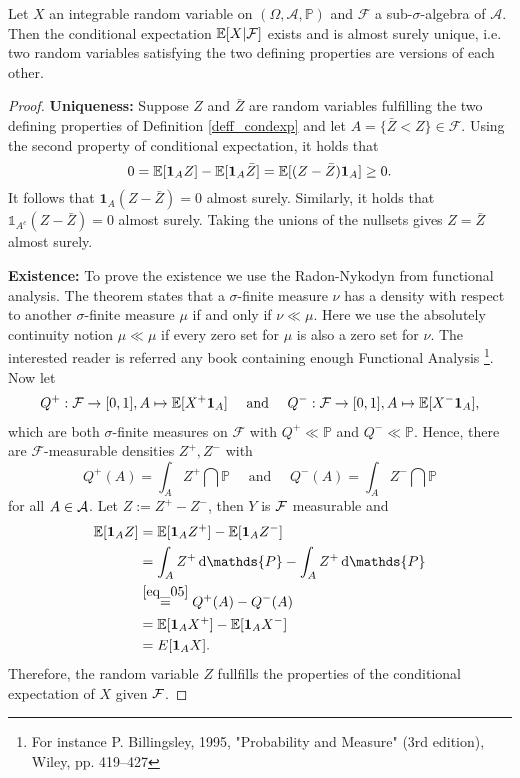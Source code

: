 \begin{lsuperwichtigersatzExistence}
\begin{theorem}\label{existenceCE}
	Let $X$ an integrable random variable on $(\Omega, \mathcal A, \mathbb P)$ and $\mathcal F$ a sub-$\sigma$-algebra of $\mathcal A$. Then the conditional expectation $\mathbb{E}[X|\mathcal F]$ exists and is almost surely unique, i.e. two random variables satisfying the two defining properties are versions of each other.
\end{theorem}
\end{lsuperwichtigersatzExistence}
\begin{proof}[Proof]
	\textbf{Uniqueness:} Suppose $Z$ and $\bar Z$ are random variables fulfilling the two defining properties of Definition \ref{deff_condexp} and let $A=\{\bar Z<Z\}\in\mathcal{F}.$ Using the second property of conditional expectation, it holds that 
	$$0=\mathbb{E}[\mathbf{1}_AZ]-\mathbb{E}[\mathbf{1}_A\bar{Z}]=\mathbb{E}[(Z-\bar{Z})\mathbf{1}_A]\ge0.$$ It follows that $\mathbf{1}_A(Z-\bar{Z})=0$ almost surely. Similarly, it holds that $\mathds{1}_{A^c}(Z-\bar{Z})=0$ almost surely. Taking the unions of the nullsets gives $Z=\bar Z$ almost surely.\smallskip
	
	\textbf{Existence:} To prove the existence we use the Radon-Nykodyn from functional analysis. The theorem states that a $\sigma$-finite measure $\nu$ has a density with respect to another $\sigma$-finite measure $\mu$ if and only if $\nu\ll \mu$. Here we use the absolutely continuity notion $\mu\ll \mu$ if every zero set for $\mu$ is also a zero set for $\nu$. The interested reader is referred any book containing enough Functional Analysis \footnote{For instance P. Billingsley, 1995, "{}Probability and Measure"{} (3rd edition), Wiley, pp. 419–427}. Now let 
	\begin{align}\label{eq_05}
		Q^+:\mathcal{F}\to[0,1],A\mapsto\mathbb{E}[X^+\mathbf{1}_A]\quad\text{ and }\quad Q^-:\mathcal{F}\to[0,1],A\mapsto\mathbb{E}[X^-\mathbf{1}_A],
	\end{align}
	which are both $\sigma$-finite measures on $\mathcal F$ with $Q^+\ll \mathbb P$ and $Q^-\ll \mathbb P$. Hence, there are $\mathcal{F}$-measurable densities $Z^+,Z^-$ with $$Q^+(A)=\int_A Z^+\dint\mathds{P}\quad \text{ and }\quad Q^-(A)=\int_A Z^-\dint\mathds{P}$$ for all $A\in\mathcal{A}$. Let $Z:=Z^+-Z^-$, then $Y$ is $\mathcal{F}$ measurable and 
	\begin{align*}
		\E[\mathbf{1}_AZ]&=\E[\mathbf{1}_AZ^+]-\E[\mathbf{1}_AZ^-]\\
		&=\int_AZ^+\dint\mathds{P}-\int_AZ^+\dint\mathds{P}\\
		&\overset{\eqref{eq_05}}=Q^+(A)-Q^-(A)\\
		&=\E[\mathbf{1}_AX^+]-\E[\mathbf{1}_AX^-]\\
		&=E[\mathbf{1}_AX].
	\end{align*}
	Therefore, the random variable $Z$ fullfills the properties of the conditional expectation of $X$ given $\mathcal{F}$.
\end{proof}
	\marginpar{\textcolor{red}{Lecture 2}}


